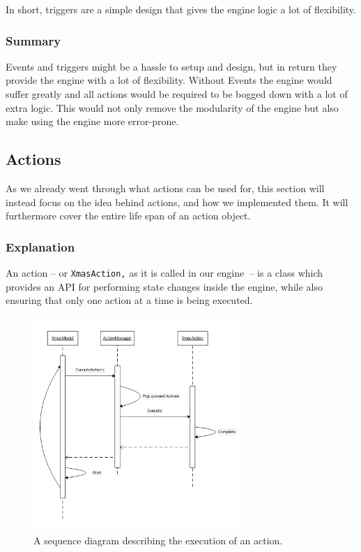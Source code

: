 In short, triggers are a simple design that gives the engine logic
a lot of flexibility. 


\subsubsection*{Summary}

Events and triggers might be a hassle to setup and design, but in
return they provide the engine with a lot of flexibility. Without
Events the engine would suffer greatly and all actions would be required
to be bogged down with a lot of extra logic. This would not only remove
the modularity of the engine but also make using the engine more error-prone.


\subsection{Actions}

As we already went through what actions can be used for, this section
will instead focus on the idea behind actions, and how we implemented
them. It will furthermore cover the entire life span of an action
object.


\subsubsection*{Explanation}

An action -- or \texttt{XmasAction,} as it is called in our engine\texttt{
}-- is a class which provides an API for performing state changes
inside the engine, while also ensuring that only one action at a time
is being executed. 

\begin{figure}
\begin{centering}
\includegraphics[width=0.7\textwidth]{ImplementationActionQueuingExplanation}
\par\end{centering}

\caption{\label{fig:ImplementationActionQueuingExplanation}A sequence diagram
describing the execution of an action.}
\end{figure}


